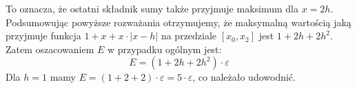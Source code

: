 \documentclass[a4paper]{article}
\begin{document}
To oznacza, że ostatni składnik sumy także przyjmuje maksimum dla $x=2h$. Podsumowując powyższe rozważania otrzymujemy, że maksymalną wartością jaką przyjmuje funkcja $1 + x + x \cdot |x-h|$ na przedziale $[x_0, x_2]$ jest $1 + 2h + 2h^2$. Zatem oszacowaniem $E$ w przypadku ogólnym jest:
$$
E = (1 + 2h + 2h^2) \cdot \varepsilon
$$
Dla $h = 1$ mamy $E=(1 + 2 + 2)\cdot \varepsilon= 5\cdot \varepsilon$, co należało udowodnić.
\end{document}
